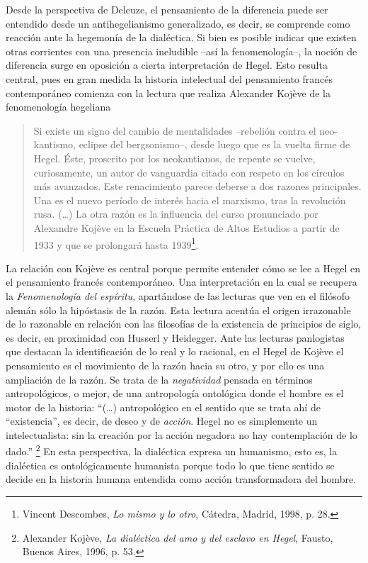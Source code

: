 \documentclass{book}
\begin{document}
Desde la perspectiva de Deleuze, el pensamiento de la diferencia puede
ser entendido desde un antihegelianismo generalizado, es decir, se
comprende como reacción ante la hegemonía de la dialéctica. Si bien es
posible indicar que existen otras corrientes con una presencia
ineludible --así la fenomenología--, la noción de diferencia surge en
oposición a cierta interpretación de Hegel. Esto resulta central, pues
en gran medida la historia intelectual del pensamiento francés
contemporáneo comienza con la lectura que realiza Alexander Kojève de la
fenomenología hegeliana

\begin{quote}
Si existe un signo del cambio de mentalidades --rebelión contra el
neo-kantismo, eclipse del bergsonismo--, desde luego que es la vuelta
firme de Hegel. Éste, proscrito por los neokantianos, de repente se
vuelve, curiosamente, un autor de vanguardia citado con respeto en los
círculos más avanzados. Este renacimiento parece deberse a dos razones
principales. Una es el nuevo período de interés hacia el marxismo, tras
la revolución rusa. (\dots) La otra razón es la influencia del
curso pronunciado por Alexandre Kojève en la Escuela Práctica de Altos
Estudios a partir de 1933 y que se prolongará hasta 1939\footnote{Vincent
  Descombes, \emph{Lo mismo y lo otro}, Cátedra, Madrid, 1998, p. 28.}.
\end{quote}

La relación con Kojève es central porque permite entender cómo se lee a
Hegel en el pensamiento francés contemporáneo. Una interpretación en la
cual se recupera la \emph{Fenomenología del espíritu}, apartándose de
las lecturas que ven en el filósofo alemán sólo la hipóstasis de la
razón. Esta lectura acentúa el origen irrazonable de lo razonable en
relación con las filosofías de la existencia de principios de siglo, es
decir, en proximidad con Husserl y Heidegger. Ante las lecturas
panlogistas que destacan la identificación de lo real y lo racional, en
el Hegel de Kojève el pensamiento es el movimiento de la razón hacia su
otro, y por ello es una ampliación de la razón. Se trata de la
\emph{negatividad} pensada en términos antropológicos, o mejor, de una
antropología ontológica donde el hombre es el motor de la historia:
\enquote{(\dots) antropológico en el sentido que se trata ahí de
``existencia'', es decir, de deseo y de \emph{acción}. Hegel no es
simplemente un intelectualista: sin la creación por la acción negadora
no hay contemplación de lo dado.} \footnote{Alexander Kojève, \emph{La
  dialéctica del amo y del esclavo en Hegel}, Fausto, Buenos Aires,
  1996, p. 53.} En esta perspectiva, la dialéctica expresa un
humanismo, esto es, la dialéctica es ontológicamente humanista porque
todo lo que tiene sentido se decide en la historia humana entendida como
acción transformadora del hombre.
\end{document}
